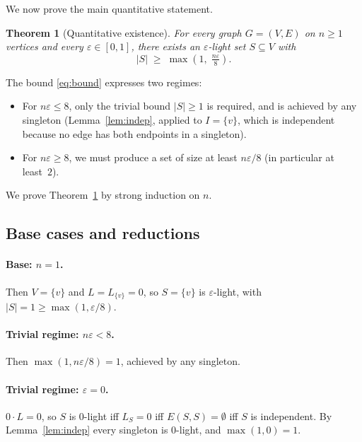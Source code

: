 \documentclass[12pt]{article}
\newtheorem{theorem}{Theorem}
\theoremstyle{definition}
\begin{document}
We now prove the main quantitative statement.

\begin{theorem}[Quantitative existence]\label{thm:quant}
For every graph $G=(V,E)$ on $n\ge 1$ vertices and every $\varepsilon\in[0,1]$, there exists an $\varepsilon$-light set $S\subseteq V$ with
\begin{equation}\label{eq:bound}
|S| \;\ge\; \max\!\left(1,\; \tfrac{n\varepsilon}{8}\right).
\end{equation}
\end{theorem}

The bound \eqref{eq:bound} expresses two regimes:
\begin{itemize}
\item For $n\varepsilon\le 8$, only the trivial bound $|S|\ge 1$ is required, and is achieved by any singleton (Lemma~\ref{lem:indep}, applied to $I=\{v\}$, which is independent because no edge has both endpoints in a singleton).
\item For $n\varepsilon\ge 8$, we must produce a set of size at least $n\varepsilon/8$ (in particular at least~$2$).
\end{itemize}
We prove Theorem~\ref{thm:quant} by strong induction on $n$.

\subsection{Base cases and reductions}

\paragraph{Base: $n=1$.}  Then $V=\{v\}$ and $L=L_{\{v\}}=0$, so $S=\{v\}$ is $\varepsilon$-light, with $|S|=1\ge\max(1,\varepsilon/8)$.

\paragraph{Trivial regime: $n\varepsilon<8$.}  Then $\max(1,n\varepsilon/8)=1$, achieved by any singleton.

\paragraph{Trivial regime: $\varepsilon=0$.}  $0\cdot L = 0$, so $S$ is $0$-light iff $L_S=0$ iff $E(S,S)=\emptyset$ iff $S$ is independent.  By Lemma~\ref{lem:indep} every singleton is $0$-light, and $\max(1,0)=1$.
\end{document}
